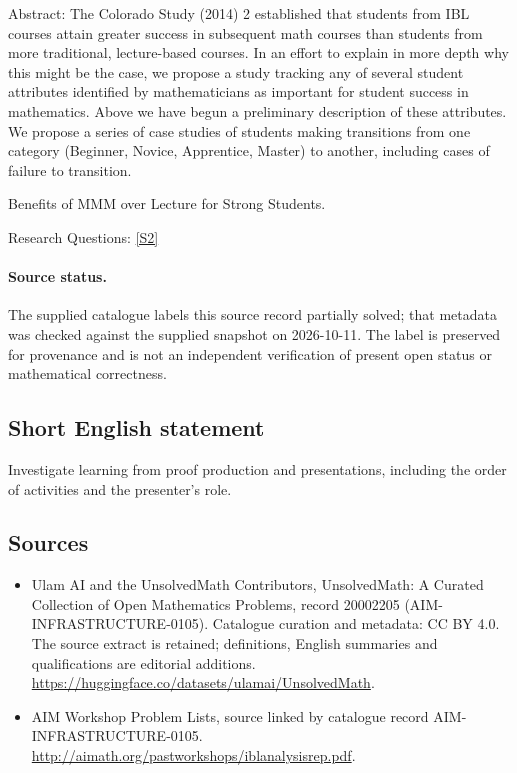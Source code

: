 \documentclass[11pt]{article}
\begin{document}
Abstract: The Colorado Study (2014) 2 established that students from IBL courses attain greater success in subsequent math courses than students from more traditional, lecture-based courses. In an effort to explain in more depth why this might be the case, we propose a study tracking any of several student attributes identified by mathematicians as important for student success in mathematics. Above we have begun a preliminary description of these attributes. We propose a series of case studies of students making transitions from one category (Beginner, Novice, Apprentice, Master) to another, including cases of failure to transition.

Benefits of MMM over Lecture for Strong Students.

Research Questions: \href{http://aimath.org/pastworkshops/iblanalysisrep.pdf}{[S2]}
\paragraph{Source status.}
The supplied catalogue labels this source record partially solved; that metadata was checked against the supplied snapshot on 2026-10-11. The label is preserved for provenance and is not an independent verification of present open status or mathematical correctness.
\subsection{Short English statement}
Investigate learning from proof production and presentations, including the order of activities and the presenter's role.
\subsection{Sources}
\begin{itemize}
\item[S1] Ulam AI and the UnsolvedMath Contributors, UnsolvedMath: A Curated Collection of Open Mathematics Problems, record 20002205 (AIM-INFRASTRUCTURE-0105). Catalogue curation and metadata: CC BY 4.0. The source extract is retained; definitions, English summaries and qualifications are editorial additions.
\url{https://huggingface.co/datasets/ulamai/UnsolvedMath}.
\item[S2] AIM Workshop Problem Lists, source linked by catalogue record AIM-INFRASTRUCTURE-0105.
\url{http://aimath.org/pastworkshops/iblanalysisrep.pdf}.
\end{itemize}
\end{document}

